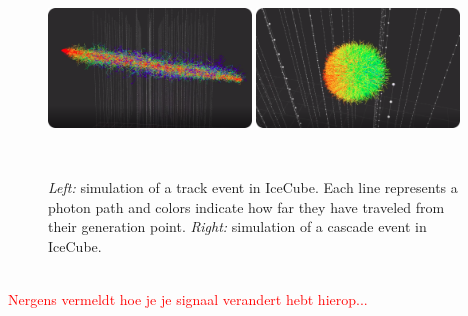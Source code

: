 \begin{figure}
\centering
\includegraphics[width=0.48\textwidth,height=1.9in]{chapter6/img/photons_track_rounded.png}
\includegraphics[width=0.48\textwidth,height=1.9in]{chapter6/img/photons_cascade_rounded.png}
\caption{\textit{Left:} simulation of a track event in IceCube. Each line represents a photon path and colors indicate how far they have traveled from their generation point. \textit{Right:} simulation of a cascade event in IceCube.}
\label{fig:photonsimulation}
\end{figure}

\textcolor{red}{\\Nergens vermeldt hoe je je signaal verandert hebt hierop...\\}

